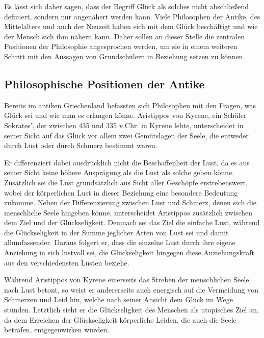 Es lässt sich daher sagen, dass der Begriff \glqq Glück\grqq{} als solches nicht abschließend definiert, sondern nur angenähert werden kann. 
Viele Philosophen der Antike, des Mittelalters und auch der Neuzeit haben sich mit dem Glück beschäftigt und wie der Mensch sich ihm nähern kann. 
Daher sollen an dieser Stelle die zentralen Positionen der Philosophie angesprochen werden, um sie in einem weiteren Schritt mit den Aussagen von Grundschülern in Beziehung setzen zu können.


\subsection{Philosophische Positionen der Antike}

Bereits im antiken Griechenland befassten sich Philosophen mit den Fragen, was Glück sei und wie man es erlangen könne. 
Aristippos von Kyrene, ein Schüler Sokrates', der zwischen 435 und 335 v.Chr. in Kyrene lebte, unterscheidet in seiner Sicht auf das Glück vor allem zwei Gemütslagen der Seele, die entweder durch Lust oder durch Schmerz bestimmt waren\cite{DL67, S.116}.

Er differenziert dabei ausdrücklich nicht die Beschaffenheit der Lust, da es aus seiner Sicht keine höhere Ausprägung als die Lust als solche geben könne. 
Zusätzlich sei die Lust grundsätzlich aus Sicht aller Geschöpfe erstrebenswert, wobei der körperlichen Lust in dieser Beziehung eine besondere Bedeutung zukomme. 
Neben der Differenzierung zwischen Lust und Schmerz, denen sich die menschliche Seele hingeben könne, unterscheidet Aristippos zusätzlich zwischen dem Ziel und der Glückseligkeit. 
Demnach sei das Ziel die einfache Lust, während die Glückseligkeit in der Summe jeglicher Arten von Lust sei und damit allumfassender\cite{DL67, S.116}.
Daraus folgert er, dass die einzelne Lust durch ihre eigene Anziehung in sich lustvoll sei, die Glückseligkeit hingegen diese Anziehungskraft aus den verschiedensten Lüsten beziehe. 

Während Aristippos von Kyrene einerseits das Streben der menschlichen Seele nach Lust betont, so weist er andererseits auch energisch auf die Vermeidung von Schmerzen und Leid hin, welche nach seiner Ansicht dem Glück im Wege stünden. 
Letztlich sieht er die Glückseligkeit des Menschen als utopisches Ziel an, da dem Erreichen der Glückseligkeit körperliche Leiden, die auch die Seele beträfen, entgegenwirken würden\cite{DL67, S.119}.

